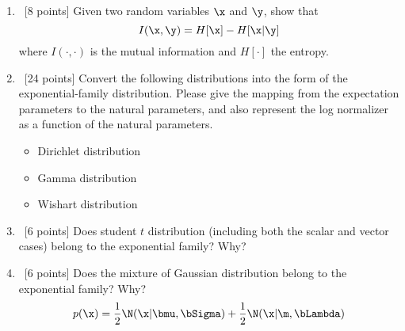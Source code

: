 \documentclass[12pt, fullpage,letterpaper]{article}
\begin{document}
\begin{enumerate}
\item~[8 points] Given two random variables $\x$ and $\y$, show that
\[
I(\x,\y) = H[\x] - H[\x|\y]
\]
where $I(\cdot, \cdot)$ is the mutual information and $H[\cdot]$ the entropy.

\item~[24 points] Convert the following distributions into the form of the exponential-family distribution. Please give the mapping from the expectation parameters to the natural parameters, and also represent the log normalizer as a function of the natural parameters.
\begin{itemize}
	\item Dirichlet distribution
	\item Gamma distribution
	\item Wishart distribution
\end{itemize}

\item~[6 points] Does student $t$ distribution (including both the scalar and vector cases) belong to the exponential family? Why?

\item~[6 points] Does the mixture of Gaussian distribution belong to the exponential family? Why? 
\[
p(\x) = \frac{1}{2}\N(\x|\bmu, \bSigma) + \frac{1}{2}\N(\x|\m, \bLambda)
\]


\end{enumerate}
\end{document}
